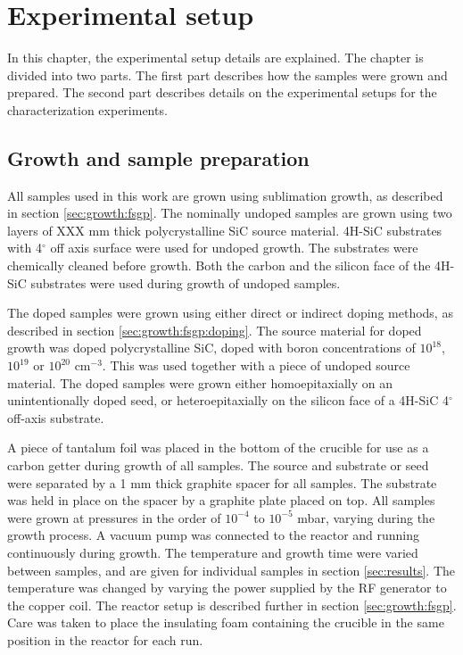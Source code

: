 
\chapter{Experimental setup}
\label{sec:experimental}
In this chapter, the experimental setup details are explained. The chapter is divided into two parts. The first part describes how the samples were grown and prepared. The second part describes details on the experimental setups for the characterization experiments. 

\section{Growth and sample preparation}
\label{sec:experimental:samples}
All samples used in this work are grown using sublimation growth, as described in section \ref{sec:growth:fsgp}. The nominally undoped samples are grown using two layers of XXX mm thick polycrystalline SiC source material. 4H-SiC substrates with 4$^\circ$ off axis surface were used for undoped growth. The substrates were chemically cleaned before growth. Both the carbon and the silicon face of the 4H-SiC substrates were used during growth of undoped samples. 

The doped samples were grown using either direct or indirect doping methods, as described in section \ref{sec:growth:fsgp:doping}. The source material for doped growth was doped polycrystalline SiC, doped with boron concentrations of $10^{18}$, $10^{19}$ or $10^{20}$ cm$^{-3}$. This was used together with a piece of undoped source material. The doped samples were grown either homoepitaxially on an unintentionally doped seed, or heteroepitaxially on the silicon face of a 4H-SiC 4$^\circ$ off-axis substrate. 

A piece of tantalum foil was placed in the bottom of the crucible for use as a carbon getter during growth of all samples. The source and substrate or seed were separated by a 1 mm thick graphite spacer for all samples. The substrate was held in place on the spacer by a graphite plate placed on top. All samples were grown at pressures in the order of $10^{-4}$ to $10^{-5}$ mbar, varying during the growth process. A vacuum pump was connected to the reactor and running continuously during growth. The temperature and growth time were varied between samples, and are given for individual samples in section \ref{sec:results}. The temperature was changed by varying the power supplied by the RF generator to the copper coil. The reactor setup is described further in section \ref{sec:growth:fsgp}. Care was taken to place the insulating foam containing the crucible in the same position in the reactor for each run. 

